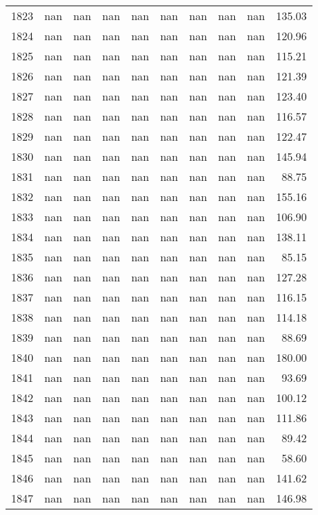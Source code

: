 \begin{tabular}{lrrrrrrrrr}
1823 & nan & nan & nan & nan & nan & nan & nan & nan & 135.03 \\
1824 & nan & nan & nan & nan & nan & nan & nan & nan & 120.96 \\
1825 & nan & nan & nan & nan & nan & nan & nan & nan & 115.21 \\
1826 & nan & nan & nan & nan & nan & nan & nan & nan & 121.39 \\
1827 & nan & nan & nan & nan & nan & nan & nan & nan & 123.40 \\
1828 & nan & nan & nan & nan & nan & nan & nan & nan & 116.57 \\
1829 & nan & nan & nan & nan & nan & nan & nan & nan & 122.47 \\
1830 & nan & nan & nan & nan & nan & nan & nan & nan & 145.94 \\
1831 & nan & nan & nan & nan & nan & nan & nan & nan & 88.75 \\
1832 & nan & nan & nan & nan & nan & nan & nan & nan & 155.16 \\
1833 & nan & nan & nan & nan & nan & nan & nan & nan & 106.90 \\
1834 & nan & nan & nan & nan & nan & nan & nan & nan & 138.11 \\
1835 & nan & nan & nan & nan & nan & nan & nan & nan & 85.15 \\
1836 & nan & nan & nan & nan & nan & nan & nan & nan & 127.28 \\
1837 & nan & nan & nan & nan & nan & nan & nan & nan & 116.15 \\
1838 & nan & nan & nan & nan & nan & nan & nan & nan & 114.18 \\
1839 & nan & nan & nan & nan & nan & nan & nan & nan & 88.69 \\
1840 & nan & nan & nan & nan & nan & nan & nan & nan & 180.00 \\
1841 & nan & nan & nan & nan & nan & nan & nan & nan & 93.69 \\
1842 & nan & nan & nan & nan & nan & nan & nan & nan & 100.12 \\
1843 & nan & nan & nan & nan & nan & nan & nan & nan & 111.86 \\
1844 & nan & nan & nan & nan & nan & nan & nan & nan & 89.42 \\
1845 & nan & nan & nan & nan & nan & nan & nan & nan & 58.60 \\
1846 & nan & nan & nan & nan & nan & nan & nan & nan & 141.62 \\
1847 & nan & nan & nan & nan & nan & nan & nan & nan & 146.98 \\

\end{tabular}

